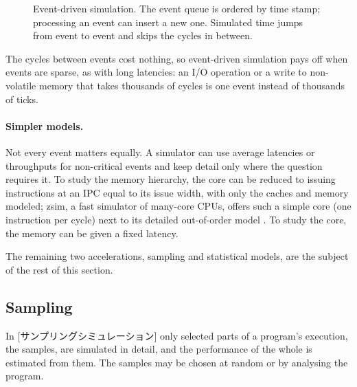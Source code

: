 \documentclass[../main.tex]{subfiles}
\begin{document}
\begin{figure}[tb]
  \centering
  
  \caption{Event-driven simulation.  The event queue is ordered by time
    stamp; processing an event can insert a new one.  Simulated time
    jumps from event to event and skips the cycles in between.}
  \label{fig:l08-event-queue}
\end{figure}

The cycles between events cost nothing, so event-driven simulation
pays off when events are sparse, as with long latencies: an I/O
operation or a write to non-volatile memory that takes thousands of
cycles is one event instead of thousands of ticks.

\paragraph{Simpler models.}  Not every event matters equally.  A
simulator can use average latencies or throughputs for non-critical
events and keep detail only where the question requires it.  To study
the memory hierarchy, the core can be reduced to issuing instructions
at an IPC equal to its issue width, with only the caches and memory
modeled; zsim, a fast simulator of many-core CPUs, offers such a
simple core (one instruction per cycle) next to its detailed
out-of-order model \cite{sanchez2013zsim}.  To study the core,
the memory can be given a fixed latency.

The remaining two accelerations, sampling and statistical models, are
the subject of the rest of this section.

\subsection{Sampling}

\begin{definition}
  \label{def:l08-sampled}
  In [サンプリングシミュレーション] only
  selected parts of a program's execution, the samples, are simulated
  in detail, and the performance of the whole is estimated from them.
  The samples may be chosen at random or by analysing the program.
\end{definition}
\end{document}
